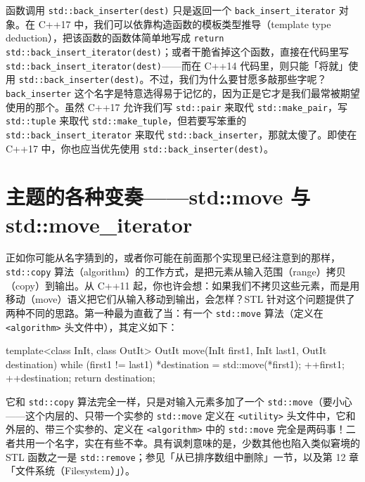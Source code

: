 函数调用 \texttt{std::\allowbreak{}back\_\allowbreak{}inserter(\allowbreak{}dest)\allowbreak{}} 只是返回一个 \texttt{back\_\allowbreak{}insert\_\allowbreak{}iterator} 对象。在 C++17 中，我们可以依靠构造函数的模板类型推导（template type deduction），把该函数的函数体简单地写成 \texttt{return std::\allowbreak{}back\_\allowbreak{}insert\_\allowbreak{}iterator(\allowbreak{}dest)\allowbreak{}}；或者干脆省掉这个函数，直接在代码里写 \texttt{std::\allowbreak{}back\_\allowbreak{}insert\_\allowbreak{}iterator(\allowbreak{}dest)\allowbreak{}}——而在 C++14 代码里，则只能「将就」使用 \texttt{std::\allowbreak{}back\_\allowbreak{}inserter(\allowbreak{}dest)\allowbreak{}}。不过，我们为什么要甘愿多敲那些字呢？\texttt{back\_\allowbreak{}inserter} 这个名字是特意选得易于记忆的，因为正是它才是我们最常被期望使用的那个。虽然 C++17 允许我们写 \texttt{std::\allowbreak{}pair} 来取代 \texttt{std::\allowbreak{}make\_\allowbreak{}pair}，写 \texttt{std::\allowbreak{}tuple} 来取代 \texttt{std::\allowbreak{}make\_\allowbreak{}tuple}，但若要写笨重的 \texttt{std::\allowbreak{}back\_\allowbreak{}insert\_\allowbreak{}iterator} 来取代 \texttt{std::\allowbreak{}back\_\allowbreak{}inserter}，那就太傻了。即使在 C++17 中，你也应当优先使用 \texttt{std::\allowbreak{}back\_\allowbreak{}inserter(\allowbreak{}dest)\allowbreak{}}。

\section{主题的各种变奏——std::move 与 std::move\_\allowbreak{}iterator}

正如你可能从名字猜到的，或者你可能在前面那个实现里已经注意到的那样，\texttt{std::\allowbreak{}copy} 算法（algorithm）的工作方式，是把元素从输入范围（range）拷贝（copy）到输出。从 C++11 起，你也许会想：如果我们不拷贝这些元素，而是用移动（move）语义把它们从输入移动到输出，会怎样？STL 针对这个问题提供了两种不同的思路。第一种最为直截了当：有一个 \texttt{std::\allowbreak{}move} 算法（定义在 \texttt{<algorithm>\allowbreak{}} 头文件中），其定义如下：

\begin{codebox}[cpp]
    template<class InIt, class OutIt>
    OutIt move(InIt first1, InIt last1, OutIt destination)
    {
      while (first1 != last1) {
        *destination = std::move(*first1);
        ++first1;
        ++destination;
      }
      return destination;
    }
\end{codebox}

它和 \texttt{std::\allowbreak{}copy} 算法完全一样，只是对输入元素多加了一个 \texttt{std::\allowbreak{}move}（要小心——这个内层的、只带一个实参的 \texttt{std::\allowbreak{}move} 定义在 \texttt{<utility>\allowbreak{}} 头文件中，它和外层的、带三个实参的、定义在 \texttt{<algorithm>\allowbreak{}} 中的 \texttt{std::\allowbreak{}move} 完全是两码事！二者共用一个名字，实在有些不幸。具有讽刺意味的是，少数其他也陷入类似窘境的 STL 函数之一是 \texttt{std::\allowbreak{}remove}；参见「从已排序数组中删除」一节，以及第 12 章「文件系统（Filesystem）」）。

